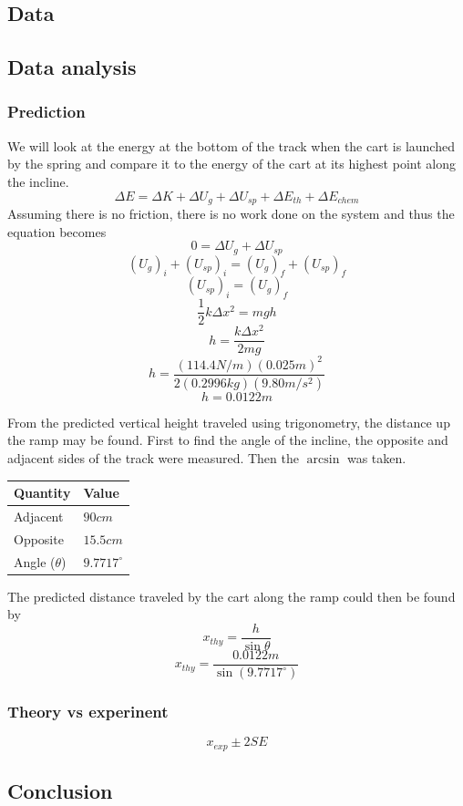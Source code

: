 \documentclass[11pt, letterpaper, includehead]{article}
\begin{document}
\subsection{Data}

\subsection{Data analysis}
\subsubsection{Prediction}
We will look at the energy at the bottom of the track when the cart is launched by 
the spring and compare it to the energy of the cart at its highest point along the incline.
$$\Delta E = \Delta K + \Delta U_{g} + \Delta U_{sp} + \Delta E_{th} + \Delta E_{chem}$$
Assuming there is no friction, there is no work done on the system and thus
the equation becomes 
$$0 = \Delta U_{g} + \Delta U_{sp}$$
$$(U_{g})_i + (U_{sp})_i = (U_{g})_f + (U_{sp})_f$$
$$(U_{sp})_i = (U_{g})_f$$
$$\frac{1}{2}k\Delta x^2 = mgh$$
$$h = \frac{k\Delta x^2}{2mg}$$
$$h = \frac{(114.4 N/m) (0.025m)^2}{2 (0.2996kg)(9.80m/s^2)}$$
$$\boxed{h = 0.0122m}$$

From the predicted vertical height traveled using trigonometry, the distance up the ramp may be found.
First to find the angle of the incline, the opposite and adjacent sides of the track were measured. Then
the $\arcsin$ was taken.

\begin{center} 
  \begin{tabular}{|  m{3cm} | m{3cm} | } 
    \hline 
    \textbf{Quantity} & \textbf{Value}\\
    \hline
    Adjacent & $90cm$ \\ 
    \hline
    Opposite & $15.5cm$ \\ 
    \hline
    Angle ($\theta$) & $9.7717^{\circ}$ \\ 
    \hline      
  \end{tabular} 
\end{center}

The predicted distance traveled by the cart along the ramp could then be
found by 
$$x_{thy} = \frac{h}{\sin \theta}$$
$$x_{thy} = \frac{0.0122m}{\sin(9.7717^{\circ})}$$

\subsubsection{Theory vs experinent}
$$x_{exp} \pm 2SE$$


\subsection{Conclusion}
\end{document}

